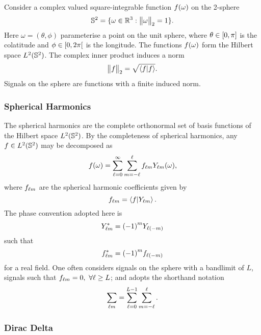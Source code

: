 Consider a complex valued square-integrable function \(f(\omega)\) on the 2-sphere
%
\begin{equation}
	\mathbb{S}^{2}{}
	= \{\omega \in \mathbb{R}^{3} : {\big\lVert\omega\big\rVert}_{2} = 1\}.
\end{equation}
%
Here \(\omega=(\theta,\phi)\) parameterise a point on the unit sphere, where \(\theta \in \interval{0}{\pi}\) is the colatitude and \(\phi \in \interval[open right]{0}{2\pi}\) is the longitude.
The functions \(f(\omega)\) form the Hilbert space \(L^{2}(\mathbb{S}^{2})\).
The complex inner product induces a norm
%
\begin{equation}
	{\big\lVert f\big\rVert}_{2}
	= \sqrt{\braket{f}}.
\end{equation}
%
Signals on the sphere are functions with a finite induced norm.

\subsubsection{Spherical Harmonics}

The spherical harmonics are the complete orthonormal set of basis functions of the Hilbert space \(L^{2}(\mathbb{S}^{2})\).
By the completeness of spherical harmonics, any \(f \in L^{2}(\mathbb{S}^{2})\) may be decomposed as
%
\begin{equation}
	f(\omega) = \sum\limits_{\ell=0}^{\infty} \sum\limits_{m=-\ell}^{\ell} {f}_{\ell m} {Y}_{\ell m}(\omega),
\end{equation}
%
where \({f}_{\ell m}\) are the spherical harmonic coefficients given by
%
\begin{equation}
	{f}_{\ell m}
	= \braket{f}{{Y}_{\ell m}}.
\end{equation}
%
The phase convention adopted here is
%
\begin{equation}
	{Y}_{\ell m}^{\ast}
	= {(-1)}^{m} Y_{\ell(-m)}
\end{equation}
%
such that
%
\begin{equation}
	{f}_{\ell m}^{\ast}
	= {(-1)}^{m} f_{\ell(-m)}
\end{equation}
%
for a real field.
One often considers signals on the sphere with a bandlimit of \(L\), \ie{} signals such that \({f}_{\ell m} = 0,\ \forall \ell \geq L\); and adopts the shorthand notation
%
\begin{equation}
	\sum\limits_{\ell m}
	= \sum\limits_{\ell=0}^{L-1} \sum\limits_{m=-\ell}^{\ell}.
\end{equation}

\subsubsection{Dirac Delta}

